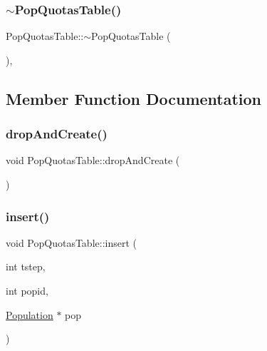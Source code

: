 \mbox{\label{class_pop_quotas_table_a5cb1ceac7abc81063857498ddd015a2f}} 
\subsubsection{\texorpdfstring{$\sim$PopQuotasTable()}{~PopQuotasTable()}}
{\footnotesize\ttfamily Pop\+Quotas\+Table\+::$\sim$\+Pop\+Quotas\+Table (\begin{DoxyParamCaption}{ }\end{DoxyParamCaption})\hspace{0.3cm}{\ttfamily [default]}, {\ttfamily [noexcept]}}



\subsection{Member Function Documentation}
\mbox{\label{class_pop_quotas_table_aa071b6a77b49537f11f9d55ad626e9c0}} 
\subsubsection{\texorpdfstring{dropAndCreate()}{dropAndCreate()}}
{\footnotesize\ttfamily void Pop\+Quotas\+Table\+::drop\+And\+Create (\begin{DoxyParamCaption}{ }\end{DoxyParamCaption})}

\mbox{\label{class_pop_quotas_table_ac5ed71c6d9c37686f61838cc3e8fd3fc}} 
\subsubsection{\texorpdfstring{insert()}{insert()}}
{\footnotesize\ttfamily void Pop\+Quotas\+Table\+::insert (\begin{DoxyParamCaption}\item[{int}]{tstep,  }\item[{int}]{popid,  }\item[{\mbox{\hyperlink{class_population}{Population}} $\ast$}]{pop }\end{DoxyParamCaption})}



